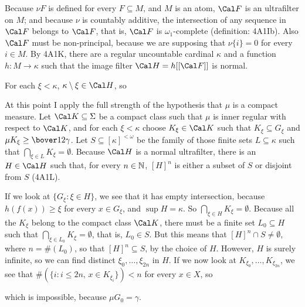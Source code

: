{

\noindent Because $\nu F$ is defined for every $F\subseteq M$, and $M$
is an atom, $\Cal F$ is an ultrafilter on $M$;  and because $\nu$ is
countably additive, the intersection of any sequence in $\Cal F$ belongs
to $\Cal F$, that is, $\Cal F$ is $\omega_1$-complete (definition:
4A1Ib).   Also $\Cal F$ must be non-principal, because we are supposing
that $\nu\{i\}=0$ for every $i\in M$.   By 4A1K, there are a regular
uncountable cardinal $\kappa$ and a
function $h:M\to\kappa$ such that the image filter $\Cal H=h[[\Cal F]]$
is normal.

For each $\xi<\kappa$, $\kappa\setminus\xi\in\Cal H$, so


\noindent At this point I apply the full strength of the hypothesis that
$\mu$ is a compact measure.   Let $\Cal K\subseteq\Sigma$ be a compact
class such that $\mu$ is inner regular with respect to $\Cal K$, and for
each $\xi<\kappa$ choose $K_{\xi}\in\Cal K$ such that
$K_{\xi}\subseteq
G_{\xi}$ and $\mu K_{\xi}\ge\bover12\gamma$.   Let
$S\subseteq[\kappa]^{<\omega}$ be the family of those finite sets
$L\subseteq\kappa$ such that $\bigcap_{\xi\in L}K_{\xi}=\emptyset$.
Because $\Cal H$ is a normal
ultrafilter, there is an $H\in\Cal H$ such that,
for every $n\in\Bbb N$, $[H]^n$ is either a subset of $S$ or disjoint
from $S$ (4A1L).

If we look at $\{G_{\xi}:\xi\in H\}$, we see that it has empty
intersection,
because $h(f(x))\ge\xi$ for every $x\in G_{\xi}$, and $\sup H=\kappa$.
So $\bigcap_{\xi\in H}K_{\xi}=\emptyset$.   Because all the $K_{\xi}$
belong to
the compact class $\Cal K$, there must be a finite set $L_0\subseteq H$
such that $\bigcap_{\xi\in L_0}K_{\xi}=\emptyset$, that is, $L_0\in S$.
But this means that $[H]^n\cap S\ne\emptyset$, where $n=\#(L_0)$, so
that $[H]^n\subseteq S$, by the choice of $H$.
However, $H$ is surely infinite, so we can find distinct
$\xi_0,\ldots,\xi_{2n}$ in $H$.   If we now look at
$K_{\xi_0},\ldots,K_{\xi_{2n}}$, we see that
$\#(\{i:i\le 2n,\,x\in K_{\xi_i}\})<n$ for every $x\in X$, so


\noindent which is impossible, because $\mu G_0=\gamma$.\ \Bang\Qed

}
